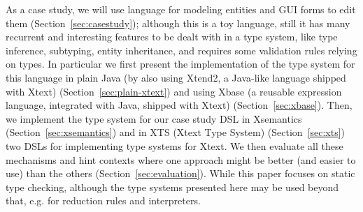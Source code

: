 As a case study, we will use language for modeling entities and GUI forms to
edit them (Section~\ref{sec:casestudy}); although this is a toy language, still
it has many recurrent and interesting features to be dealt with in a type
system, like type inference, subtyping, entity inheritance, and requires some
validation rules relying on types.  In particular we first present the
implementation of the type system for this language in plain Java (by also using
Xtend2, a Java-like language shipped with Xtext) (Section~\ref{sec:plain-xtext})
and using Xbase (a reusable expression language, integrated with Java, shipped
with Xtext) (Section~\ref{sec:xbase}).
Then, we implement the type system for our case study DSL in Xsemantics
(Section~\ref{sec:xsemantics}) and in XTS (Xtext Type System)
(Section~\ref{sec:xts}) two DSLs for implementing type systems for Xtext.
We then evaluate all these mechanisms and hint contexts where one approach
might be better (and easier to use) than the others
(Section~\ref{sec:evaluation}).
While this paper focuses on static type checking, although the type systems
presented here may be used beyond that, e.g. for reduction rules and
interpreters.


